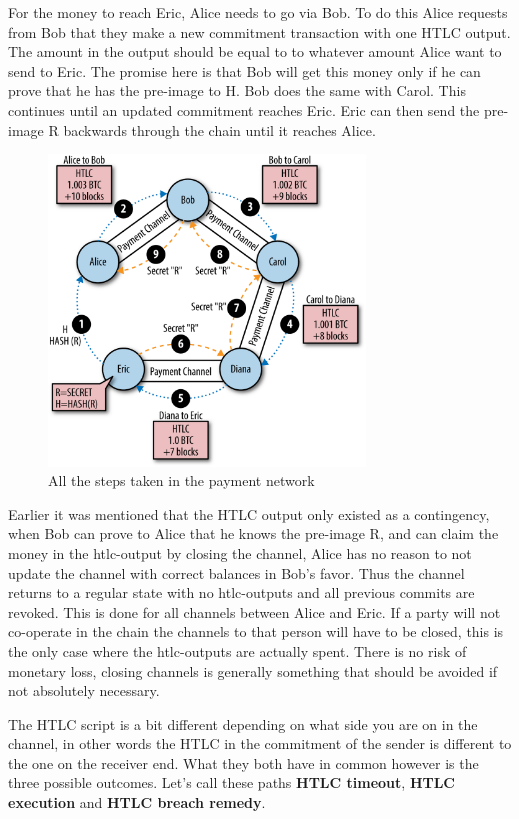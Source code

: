 For the money to reach Eric, Alice needs to go via Bob. To do this Alice requests from Bob that they make a new commitment transaction with one HTLC output. The amount in the output should be equal to to whatever amount Alice want to send to Eric. The promise here is that Bob will get this money only if he can prove that he has the pre-image to H. Bob does the same with Carol. This continues until an updated commitment reaches Eric. Eric can then send the pre-image R backwards through the chain until it reaches Alice. 

\begin{figure}[H]
	\centering
	\includegraphics[width=0.75\textwidth]{background/images/pc_route_backwards.png}
	\caption{All the steps taken in the payment network}
	\label{fig:pc-route-final}
\end{figure}

Earlier it was mentioned that the HTLC output only existed as a contingency, when Bob can prove to Alice that he knows the pre-image R, and can claim the money in the htlc-output by closing the channel, Alice has no reason to not update the channel with correct balances in Bob's favor. Thus the channel returns to a regular state with no htlc-outputs and all previous commits are revoked. This is done for all channels between Alice and Eric. If a party will not co-operate in the chain the channels to that person will have to be closed, this is the only case where the htlc-outputs are actually spent. There is no risk of monetary loss, closing channels is generally something that should be avoided if not absolutely necessary.

The HTLC script is a bit different depending on what side you are on in the channel, in other words the HTLC in the commitment of the sender is different to the one on the receiver end. What they both have in common however is the three possible outcomes. Let's call these paths \textbf{HTLC timeout}, \textbf{HTLC execution} and \textbf{HTLC breach remedy}.

